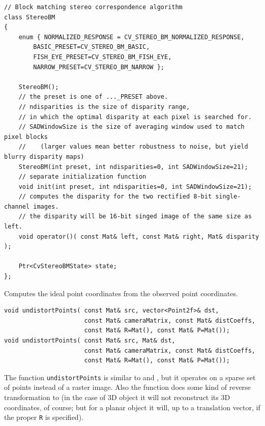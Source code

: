 \begin{lstlisting}
// Block matching stereo correspondence algorithm
class StereoBM
{
    enum { NORMALIZED_RESPONSE = CV_STEREO_BM_NORMALIZED_RESPONSE,
        BASIC_PRESET=CV_STEREO_BM_BASIC,
        FISH_EYE_PRESET=CV_STEREO_BM_FISH_EYE,
        NARROW_PRESET=CV_STEREO_BM_NARROW };
    
    StereoBM();
    // the preset is one of ..._PRESET above.
    // ndisparities is the size of disparity range,
    // in which the optimal disparity at each pixel is searched for.
    // SADWindowSize is the size of averaging window used to match pixel blocks
    //    (larger values mean better robustness to noise, but yield blurry disparity maps)
    StereoBM(int preset, int ndisparities=0, int SADWindowSize=21);
    // separate initialization function
    void init(int preset, int ndisparities=0, int SADWindowSize=21);
    // computes the disparity for the two rectified 8-bit single-channel images.
    // the disparity will be 16-bit singed image of the same size as left.
    void operator()( const Mat& left, const Mat& right, Mat& disparity );

    Ptr<CvStereoBMState> state;
};
\end{lstlisting}

\label{undistortPoints}
Computes the ideal point coordinates from the observed point coordinates.

\begin{lstlisting}
void undistortPoints( const Mat& src, vector<Point2f>& dst,
                      const Mat& cameraMatrix, const Mat& distCoeffs,
                      const Mat& R=Mat(), const Mat& P=Mat());
void undistortPoints( const Mat& src, Mat& dst,
                      const Mat& cameraMatrix, const Mat& distCoeffs,
                      const Mat& R=Mat(), const Mat& P=Mat());
\end{lstlisting}
\begin{description}
\end{description}

The function \texttt{undistortPoints} is similar to  and , but it operates on a sparse set of points instead of a raster image. Also the function does some kind of reverse transformation to  (in the case of 3D object it will not reconstruct its 3D coordinates, of course; but for a planar object it will, up to a translation vector, if the proper \texttt{R} is specified).
